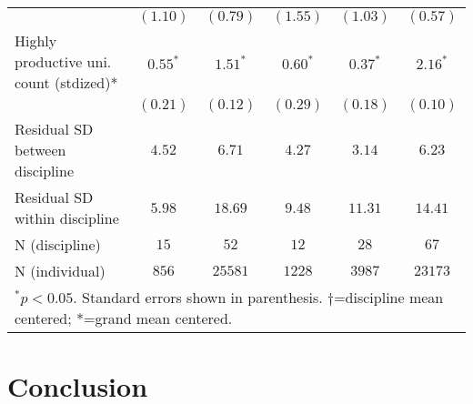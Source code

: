 \documentclass[
  10pt,
  letterpaper,
]{article}
\begin{document}
\begin{table}[!t]
\begin{adjustwidth}{-1.5in}{0in}
\begin{center}
\begin{tabular}{l c c c c c}
                                        & $(1.10)$     & $(0.79)$     & $(1.55)$    & $(1.03)$     & $(0.57)$     \\
Highly productive uni. count (stdized)* & $0.55^{*}$   & $1.51^{*}$   & $0.60^{*}$  & $0.37^{*}$   & $2.16^{*}$   \\
                                        & $(0.21)$     & $(0.12)$     & $(0.29)$    & $(0.18)$     & $(0.10)$     \\
\hline
Residual SD between discipline          & $4.52$       & $6.71$       & $4.27$      & $3.14$       & $6.23$       \\
Residual SD within discipline           & $5.98$       & $18.69$      & $9.48$      & $11.31$      & $14.41$      \\
N (discipline)                          & $15$         & $52$         & $12$        & $28$         & $67$         \\
N (individual)                          & $856$        & $25581$      & $1228$      & $3987$       & $23173$      \\
\hline
\multicolumn{6}{l}{\scriptsize{$^{*}p<0.05$. Standard errors shown in parenthesis. $\dagger$=discipline mean centered; *=grand mean centered.}}
\end{tabular}
\label{table:coefficients}
\end{center}
\end{adjustwidth}
\end{table}

\hypertarget{conclusion}{%
\section{Conclusion}\label{conclusion}}
\end{document}
